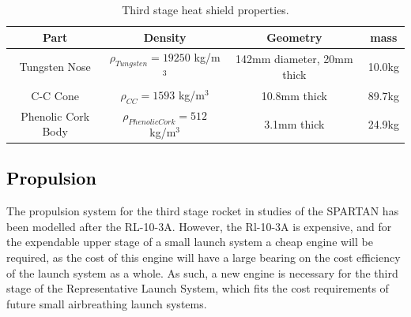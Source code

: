 		\begin{table}[h]
			\centering
\begin{tabular}{|c|c|c|c|}
	\hline  Part & Density & Geometry & mass \\ 
	\hline  Tungsten Nose & $\rho_{Tungsten} = 19250$  kg/m$^3$ & 142mm diameter, 20mm thick & 10.0kg \\ 
		\hline C-C Cone & $\rho_{CC} = 1593$  kg/m$^3$ & 10.8mm thick & 89.7kg \\ 
			\hline Phenolic Cork Body & $\rho_{Phenolic Cork} = 512$  kg/m$^3$ & 3.1mm thick & 24.9kg \\ 
	\hline 
\end{tabular} 
\caption{Third stage heat shield properties.} %
\label{tab:heatshield}
\end{table}
		
		\textcolor{black}{
		\subsection{Propulsion}\label{sec:thirdstageprop}
	}
	\noindent
	The propulsion system for the third stage rocket in studies of the SPARTAN has been modelled after the RL-10-3A\cite{Preller2018a}. However, the Rl-10-3A is expensive, and for the expendable upper stage of a small launch system a cheap engine will be required, as the cost of this engine will have a large bearing on the cost efficiency of the launch system as a whole. As such, a new engine is necessary for the third stage of the Representative Launch System, which fits the cost requirements of future small airbreathing launch systems.

